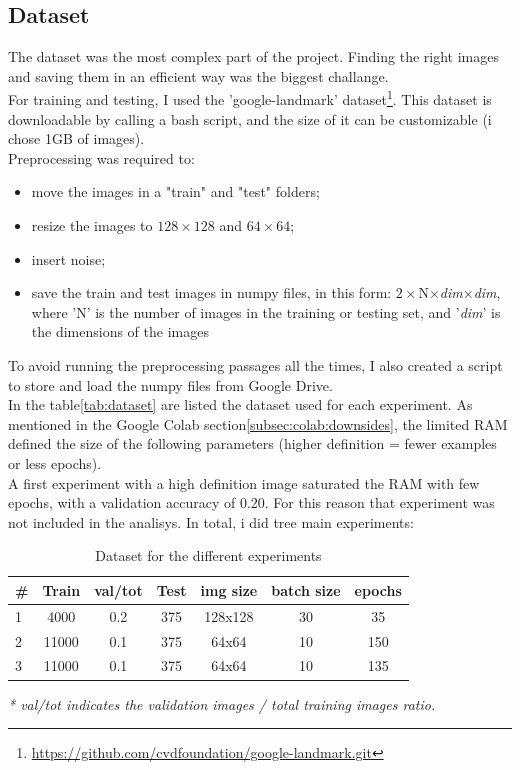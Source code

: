 \documentclass[twocolumn,showpacs,%
  nofootinbib,aps,superscriptaddress,%
  eqsecnum,prd,notitlepage,showkeys,10pt]{revtex4-1}
\begin{document}
\subsection{Dataset}
\label{subsec:dataset}
The dataset was the most complex part of the project. Finding the right images and saving them in an efficient way was the biggest challange.\\
For training and testing, I used the 'google-landmark' dataset\footnote{\url{https://github.com/cvdfoundation/google-landmark.git}}. This dataset is downloadable by calling a bash script, and the size of it can be customizable (i chose 1GB of images).\\
Preprocessing was required to:
\begin{itemize}
    \item move the images in a "train" and "test" folders;
    \item resize the images to $128\times128$ and $64\times64$;
    \item insert noise;
    \item save the train and test images in numpy files, in this form: $2\times$N$\times$\textit{dim}$\times$\textit{dim}, where 'N' is the number of images in the training or testing set, and '\textit{dim}' is the dimensions of the images 
\end{itemize}
To avoid running the preprocessing passages all the times, I also created a script to store and load the numpy files from Google Drive.\\
In the table\ref{tab:dataset} are listed the dataset used for each experiment. As mentioned in the Google Colab section\ref{subsec:colab:downsides}, the limited RAM defined the size of the following parameters (higher definition = fewer examples or less epochs).\\
A first experiment with a high definition image saturated the RAM with few epochs, with a validation accuracy of 0.20. For this reason that experiment was not included in the analisys.
In total, i did tree main experiments:
\begin{table}[H] \label{tab:dataset}
    \centering
    \begin{tabular}{l|c|c|c|c|c|c}
    \#         & Train           & val/tot\* & Test       & img size       & batch size & epochs \\\hline
    1          &  4000           & 0.2      &  375       &  128x128    & 30   &  35 \\\hline
    2          &  11000          & 0.1      &  375       &  64x64      & 10     &  150\\\hline
    3          &  11000          & 0.1      &  375       &  64x64      & 10     &  135
    \end{tabular}
    \caption{\label{tab:widgets}Dataset for the different experiments}
    \end{table}
\textit{* val/tot indicates the validation images / total training images ratio.}\\
\end{document}
